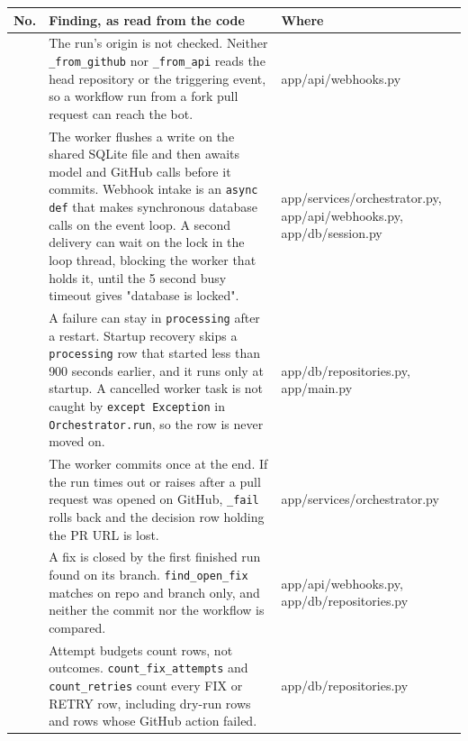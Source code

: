 \begingroup\small
\begin{longtable}{>{\raggedright\arraybackslash}p{0.069\dimexpr\linewidth-6\tabcolsep\relax}>{\raggedright\arraybackslash}p{0.414\dimexpr\linewidth-6\tabcolsep\relax}>{\raggedright\arraybackslash}p{0.517\dimexpr\linewidth-6\tabcolsep\relax}}
\toprule
\rowcolor{gray!14}\textbf{No.} & \textbf{Finding, as read from the code} & \textbf{Where} \\
\midrule
\endhead
\bottomrule
\endfoot
\endlastfoot
1 & The run's origin is not checked. Neither \texttt{\_\allowbreak{}from\_\allowbreak{}github} nor \texttt{\_\allowbreak{}from\_\allowbreak{}api} reads the head repository or the triggering event, so a workflow run from a fork pull request can reach the bot. & app/\allowbreak{}api/\allowbreak{}webhooks.py \\
2 & The worker flushes a write on the shared SQLite file and then awaits model and GitHub calls before it commits. Webhook intake is an \texttt{async def} that makes synchronous database calls on the event loop. A second delivery can wait on the lock in the loop thread, blocking the worker that holds it, until the 5 second busy timeout gives "database is locked". & app/\allowbreak{}services/\allowbreak{}orchestrator.py, app/\allowbreak{}api/\allowbreak{}webhooks.py, app/\allowbreak{}db/\allowbreak{}session.py \\
3 & A failure can stay in \texttt{processing} after a restart. Startup recovery skips a \texttt{processing} row that started less than 900 seconds earlier, and it runs only at startup. A cancelled worker task is not caught by \texttt{except Exception} in \texttt{Orchestrator.\allowbreak{}run}, so the row is never moved on. & app/\allowbreak{}db/\allowbreak{}repositories.py, app/\allowbreak{}main.py \\
4 & The worker commits once at the end. If the run times out or raises after a pull request was opened on GitHub, \texttt{\_\allowbreak{}fail} rolls back and the decision row holding the PR URL is lost. & app/\allowbreak{}services/\allowbreak{}orchestrator.py \\
5 & A fix is closed by the first finished run found on its branch. \texttt{find\_\allowbreak{}open\_\allowbreak{}fix} matches on repo and branch only, and neither the commit nor the workflow is compared. & app/\allowbreak{}api/\allowbreak{}webhooks.py, app/\allowbreak{}db/\allowbreak{}repositories.py \\
6 & Attempt budgets count rows, not outcomes. \texttt{count\_\allowbreak{}fix\_\allowbreak{}attempts} and \texttt{count\_\allowbreak{}retries} count every FIX or RETRY row, including dry-run rows and rows whose GitHub action failed. & app/\allowbreak{}db/\allowbreak{}repositories.py \\

\end{longtable}
